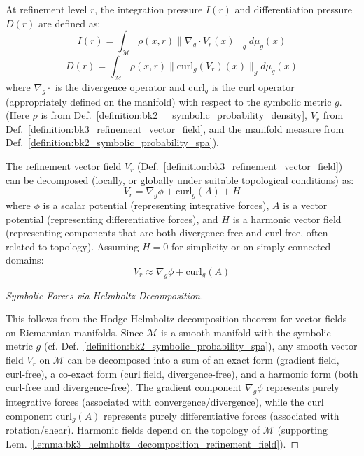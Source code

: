 \begin{definition} \label{definition:bk3_integration_differentiation_pressures}
At refinement level $r$, the integration pressure $I(r)$ and differentiation pressure $D(r)$ are defined as:
\[
I(r) = \int_{\mathcal{M}} \rho(x,r) \|\nabla_g \cdot V_r(x)\|_g d\mu_g(x)
\]
\[
D(r) = \int_{\mathcal{M}} \rho(x,r) \|\text{curl}_g(V_r)(x)\|_g d\mu_g(x)
\]
where $\nabla_g \cdot$ is the divergence operator and $\text{curl}_g$ is the curl operator (appropriately defined on the manifold) with respect to the symbolic metric $g$. (Here $\rho$ is from Def.~\ref{definition:bk2__symbolic_probability_density}, $V_r$ from Def.~\ref{definition:bk3_refinement_vector_field}, and the manifold measure from Def.~\ref{definition:bk2_symbolic_probability_spa}).
\end{definition}

\begin{lemma} \label{lemma:bk3_helmholtz_decomposition_refinement_field}
The refinement vector field $V_r$ (Def.~\ref{definition:bk3_refinement_vector_field}) can be decomposed (locally, or globally under suitable topological conditions) as:
\[
V_r = \nabla_g \phi + \text{curl}_g(A) + H
\]
where $\phi$ is a scalar potential (representing integrative forces), $A$ is a vector potential (representing differentiative forces), and $H$ is a harmonic vector field (representing components that are both divergence-free and curl-free, often related to topology). Assuming $H=0$ for simplicity or on simply connected domains:
\[
V_r \approx \nabla_g \phi + \text{curl}_g(A)
\]
\end{lemma}

\begin{proof}[Symbolic Forces via Helmholtz Decomposition]
\label{proof:bk3_symbolic_helmholtz_decomposition}
\leavevmode

This follows from the Hodge-Helmholtz decomposition theorem for vector fields on Riemannian manifolds. Since $\mathcal{M}$ is a smooth manifold with the symbolic metric $g$ (cf. Def.~\ref{definition:bk2_symbolic_probability_spa}), any smooth vector field $V_r$ on $\mathcal{M}$ can be decomposed into a sum of an exact form (gradient field, curl-free), a co-exact form (curl field, divergence-free), and a harmonic form (both curl-free and divergence-free). The gradient component $\nabla_g \phi$ represents purely integrative forces (associated with convergence/divergence), while the curl component $\text{curl}_g(A)$ represents purely differentiative forces (associated with rotation/shear). Harmonic fields depend on the topology of $\mathcal{M}$ (supporting Lem.~\ref{lemma:bk3_helmholtz_decomposition_refinement_field}).
\end{proof}

